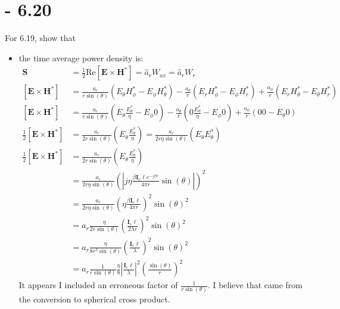 \documentclass[12pt]{article}
\begin{document}
\section{- 6.20}
For 6.19, show that
\begin{itemize}
\item the time average power density is:
  \begin{align*}
    \mathbf{S} &= \frac{1}{2}\text{Re}{[\mathbf{E}\times\mathbf{H}^*]} = \hat a_r W_{av} = \hat a_r W_{r}\\
    [\mathbf{E}\times\mathbf{H}^*] &= \frac{a_r}{r\sin{\left(\theta\right)}}\left(E_{\theta}H^*_{\phi}-E_{\phi}H^*_{\theta}\right) - \frac{a_\theta}{r}\left(E_{r}H^*_{\phi}-E_{\phi}H^*_{r}\right) + \frac{a_\phi}{r}\left(E_{r}H^*_{\theta}-E_{\theta}H^*_{r}\right)\\
    [\mathbf{E}\times\mathbf{H}^*] &= \frac{a_r}{r\sin{\left(\theta\right)}}\left(E_{\theta}\frac{E^*_{\theta}}{\eta}-E_{\phi}0\right) - \frac{a_\theta}{r}\left(0\frac{E^*_{\theta}}{\eta}-E_{\phi}0\right) + \frac{a_\phi}{r}\left(00-E_{\theta}0\right)\\
    \frac{1}{2}[\mathbf{E}\times\mathbf{H}^*] &= \frac{a_r}{2r\sin{\left(\theta\right)}}\left(E_{\theta}\frac{E^*_{\theta}}{\eta}\right) = \frac{a_r}{2r\eta\sin{\left(\theta\right)}}\left(E_{\theta}E^*_{\theta}\right)\\
    \frac{1}{2}[\mathbf{E}\times\mathbf{H}^*] &= \frac{a_r}{2r\sin{\left(\theta\right)}}\left(E_{\theta}\frac{E^*_{\theta}}{\eta}\right) \\
    &= \frac{a_r}{2r\eta\sin{\left(\theta\right)}}\left(\left|j\eta \frac{\beta \bm{I}_e\ell e^{-j\beta r}}{4 \pi r} \sin{(\theta)}\right|\right)^2\\
    &= \frac{a_r}{2r\eta\sin{\left(\theta\right)}}\left(\eta \frac{\beta \bm{I}_e\ell}{4 \pi r}\right)^2 \sin{(\theta)}^2\\
    &= a_r\frac{\eta}{2r\sin{\left(\theta\right)}}\left( \frac{ \bm{I}_e\ell}{2 \lambda r}\right)^2 \sin{(\theta)}^2\\
    &= a_r\frac{\eta}{8r^3\sin{\left(\theta\right)}}\left( \frac{ \bm{I}_e\ell}{\lambda}\right)^2 \sin{(\theta)}^2\\
    &= a_r\frac{1}{r\sin{\left(\theta\right)}}\frac{\eta}{8}\left| \frac{ \bm{I}_e\ell}{\lambda}\right|^2 \left(\frac{\sin{(\theta)}}{r}\right)^2
  \end{align*}
  It appears I included an erroneous factor of $\frac{1}{r\sin{\left(\theta\right)}}$. I believe that came from the conversion to spherical cross product. 

\end{itemize}
\end{document}
